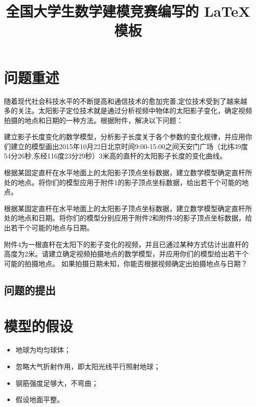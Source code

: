 \documentclass[withoutpreface,bwprint]{cumcmthesis} %
\title{全国大学生数学建模竞赛编写的 \LaTeX{} 模板}
\begin{document}
 \maketitle
 \begin{abstract}


\end{abstract}

\section{问题重述} 

随着现代社会科技水平的不断提高和通信技术的愈加完善,定位技术受到了越来越多的关注。太阳影子定位技术就是通过分析视频中物体的太阳影子变化，确定视频拍摄的地点和日期的一种方法。根据附件，解决以下问题：
\item 建立影子长度变化的数学模型，分析影子长度关于各个参数的变化规律，并应用你们建立的模型画出2015年10月22日北京时间9:00-15:00之间天安门广场（北纬39度54分26秒,东经116度23分29秒）3米高的直杆的太阳影子长度的变化曲线。
\item 根据某固定直杆在水平地面上的太阳影子顶点坐标数据，建立数学模型确定直杆所处的地点。将你们的模型应用于附件1的影子顶点坐标数据，给出若干个可能的地点。
\item 根据某固定直杆在水平地面上的太阳影子顶点坐标数据，建立数学模型确定直杆所处的地点和日期。将你们的模型分别应用于附件2和附件3的影子顶点坐标数据，给出若干个可能的地点与日期。
\item 附件4为一根直杆在太阳下的影子变化的视频，并且已通过某种方式估计出直杆的高度为2米。请建立确定视频拍摄地点的数学模型，并应用你们的模型给出若干个可能的拍摄地点。
如果拍摄日期未知，你能否根据视频确定出拍摄地点与日期？


\subsection{问题的提出}



\section{模型的假设}

\begin{itemize}
\item 地球为均匀球体；
\item 忽略大气折射作用，即太阳光线平行照射地球；
\item 钢筋强度足够大，不弯曲；
\item 假设地面平整。
\end{itemize}
\end{document}
